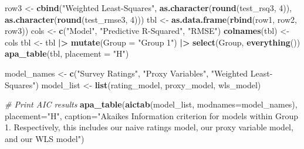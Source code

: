 \documentclass[
  man,floatsintext]{apa6}
\newenvironment{Shaded}{\begin{snugshade}}{\end{snugshade}}
\newcommand{\AttributeTok}[1]{\textcolor[rgb]{0.13,0.29,0.53}{#1}}
\newcommand{\CommentTok}[1]{\textcolor[rgb]{0.56,0.35,0.01}{\textit{#1}}}
\newcommand{\DecValTok}[1]{\textcolor[rgb]{0.00,0.00,0.81}{#1}}
\newcommand{\FunctionTok}[1]{\textcolor[rgb]{0.13,0.29,0.53}{\textbf{#1}}}
\newcommand{\NormalTok}[1]{#1}
\newcommand{\OtherTok}[1]{\textcolor[rgb]{0.56,0.35,0.01}{#1}}
\newcommand{\SpecialCharTok}[1]{\textcolor[rgb]{0.81,0.36,0.00}{\textbf{#1}}}
\newcommand{\StringTok}[1]{\textcolor[rgb]{0.31,0.60,0.02}{#1}}
\begin{document}
\begin{Shaded}
\begin{Highlighting}[]
\NormalTok{row3 }\OtherTok{\textless{}{-}} \FunctionTok{cbind}\NormalTok{(}\StringTok{"Weighted Least{-}Squares"}\NormalTok{,}
              \FunctionTok{as.character}\NormalTok{(}\FunctionTok{round}\NormalTok{(test\_rsq3, }\DecValTok{4}\NormalTok{)),}
              \FunctionTok{as.character}\NormalTok{(}\FunctionTok{round}\NormalTok{(test\_rmse3, }\DecValTok{4}\NormalTok{)))}
\NormalTok{tbl }\OtherTok{\textless{}{-}} \FunctionTok{as.data.frame}\NormalTok{(}\FunctionTok{rbind}\NormalTok{(row1, row2, row3))}
\NormalTok{cols }\OtherTok{\textless{}{-}} \FunctionTok{c}\NormalTok{(}\StringTok{"Model"}\NormalTok{, }\StringTok{"Predictive R{-}Squared"}\NormalTok{, }\StringTok{"RMSE"}\NormalTok{)}
\FunctionTok{colnames}\NormalTok{(tbl) }\OtherTok{\textless{}{-}}\NormalTok{ cols}
\NormalTok{tbl }\OtherTok{\textless{}{-}}\NormalTok{ tbl }\SpecialCharTok{|\textgreater{}}
    \FunctionTok{mutate}\NormalTok{(}\AttributeTok{Group =} \StringTok{"Group 1"}\NormalTok{) }\SpecialCharTok{|\textgreater{}}
    \FunctionTok{select}\NormalTok{(Group, }\FunctionTok{everything}\NormalTok{())}
\FunctionTok{apa\_table}\NormalTok{(tbl, }\AttributeTok{placement =} \StringTok{"H"}\NormalTok{)}

\NormalTok{model\_names }\OtherTok{\textless{}{-}} \FunctionTok{c}\NormalTok{(}\StringTok{"Survey Ratings"}\NormalTok{, }\StringTok{"Proxy Variables"}\NormalTok{, }\StringTok{"Weighted Least{-}Squares"}\NormalTok{)}
\NormalTok{model\_list }\OtherTok{\textless{}{-}} \FunctionTok{list}\NormalTok{(rating\_model, proxy\_model, wls\_model)}


\CommentTok{\# Print AIC results}
\FunctionTok{apa\_table}\NormalTok{(}\FunctionTok{aictab}\NormalTok{(model\_list, }\AttributeTok{modnames=}\NormalTok{model\_names), }\AttributeTok{placement=}\StringTok{"H"}\NormalTok{, }\AttributeTok{caption=}\StringTok{"Akaike\textquotesingle{}s Information criterion for model\textquotesingle{}s within Group 1. Respectively, this includes our naive ratings model, our proxy variable model, and our WLS model"}\NormalTok{)}


\end{Highlighting}
\end{Shaded}
\end{document}
